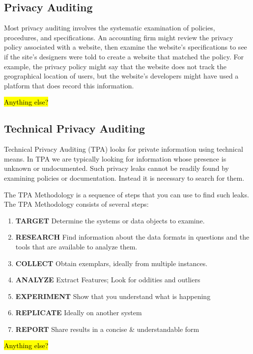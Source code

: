 \subsection{Privacy Auditing \INDEV}

Most privacy auditing involves the systematic examination of policies,
procedures, and specifications. An accounting firm might review the
privacy policy associated with a website, then examine the website's
specifications to see if the site's designers were told to create a
website that matched the policy. For example, the privacy policy might
say that the website does not track the geographical location of
users, but the website's developers might have used a platform that
does record this information. 

\hl{Anything else?}

\subsection{Technical Privacy Auditing}

Technical Privacy Auditing (TPA) looks for private
information using technical means.  In TPA we are typically looking
for information whose presence is unknown or undocumented. Such
privacy leaks cannot be readily found by examining policies or
documentation. Instead it is necessary to search for them.

The TPA Methodology is a sequence of steps that you can use to find
such leaks. The TPA Methodology consists of several steps:

\begin{enumerate}
\item \textbf{TARGET} Determine the systems or data objects to examine.
\item \textbf{RESEARCH} Find information about the data formats in
  questions and the tools that are available to analyze them. 
\item \textbf{COLLECT} Obtain exemplars, ideally from multiple instances.
\item \textbf{ANALYZE} Extract Features; Look for oddities and outliers
\item \textbf{EXPERIMENT} Show that you understand what is happening
\item \textbf{REPLICATE} Ideally on another system
\item \textbf{REPORT} Share results in a concise \& understandable form
\end{enumerate}

\hl{Anything else?}

